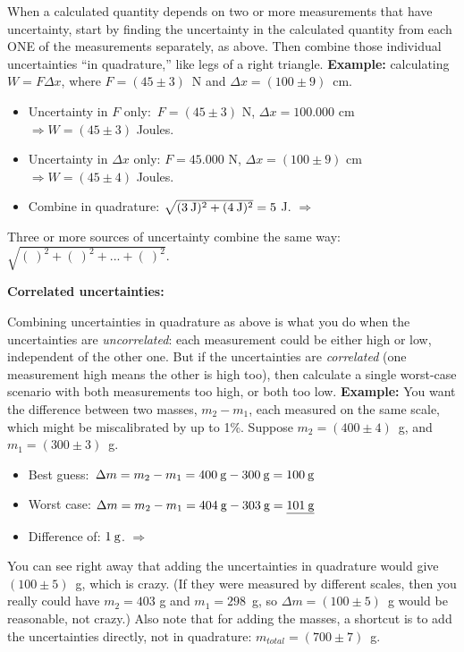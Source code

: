 When a calculated quantity depends on two or more measurements that have uncertainty, start by finding the uncertainty in the calculated quantity from each ONE of the measurements separately, as above.  Then combine those individual uncertainties ``in quadrature,'' like legs of a right triangle. \textbf{Example:} calculating $W=F \Delta x$, where $F=\left(45\pm3 \right)$~N and $\Delta x=(100\pm9)$~cm. 
\begin{itemize} \itemsep1pt
\vspace{-0.35cm}
	\item Uncertainty in $F$ only:   \:\:\,$F=(45\pm3)$ N, $\Delta x=100.000$ cm $\Longrightarrow W=(45\pm3)$ Joules.
	\item Uncertainty in $\Delta x$ only: $F=45.000$ N, $\Delta x=(100\pm9)$ cm $\Longrightarrow W=(45\pm4)$ Joules.
\vspace{-0.10cm}
		\item Combine in quadrature: $\sqrt{(3 \:\rm{J})^2+(4 \:\rm{J} )^2 } =5$ J.  $\Longrightarrow$ 
\end{itemize}
\vspace{-0.35cm}
Three or more sources of uncertainty combine the same way: $\sqrt{(\:)^2 + (\:)^2 +...+ (\:)^2 }$.
\vspace{+0.15cm}

\textbf{Correlated uncertainties:}
\vspace{-.8\parskip}

Combining uncertainties in quadrature as above is what you do when the uncertainties are \textit{uncorrelated}: each measurement could be either high or low, independent of the other one.  But if the uncertainties are \textit{correlated} (one measurement high means the other is high too), then calculate a single worst-case scenario with both measurements too high, or both too low. \textbf{Example:} You want the difference between two masses, $m_2-m_1$, each measured on the same scale, which might be miscalibrated by up to 1\%.  Suppose $m_2=(400\pm4)$~g, and $m_1=(300\pm3)$~g. 
\begin{itemize} \itemsep1pt
\vspace{-0.35cm}
	\item Best guess: $\,\Delta m=m_2-m_1=400 \:\rm{ g}-300 \:\rm{ g} = 100 \:\rm{ g}$
	\item Worst case: $  \Delta m=m_2-m_1=404 \:\rm{ g}-303 \:\rm{ g} = \underline{ 101 \:\rm{ g}}$
\vspace{-0.15cm}
	\item Difference of: \hspace{151pt}                        $1 \:\rm{g}$. $\Longrightarrow$ 
\end{itemize}
\vspace{-0.35cm}
You can see right away that adding the uncertainties in quadrature would give $(100\pm5)$~g, which is crazy.  (If they were measured by different scales, then you really could have $m_2=403$ g and $m_1=298$~g, so $\Delta m=(100\pm 5)$~g would be reasonable, not crazy.)  Also note that for adding the masses, a shortcut is to add the uncertainties directly, not in quadrature: $m_{total}=(700\pm 7)$~g.
\vspace{+0.15cm}

